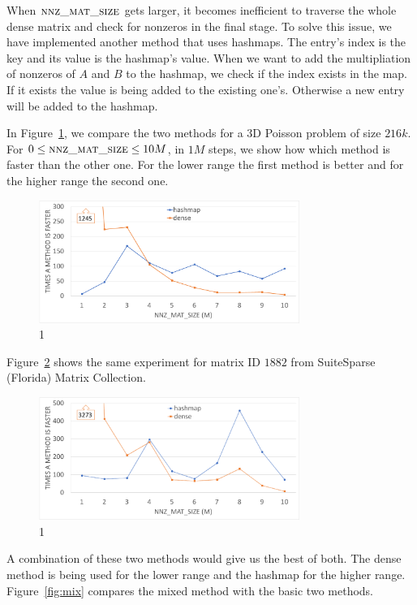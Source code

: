 When $\textsc{nnz\_mat\_size}$ gets larger, it becomes inefficient to traverse the whole dense matrix and check for nonzeros in the final stage. To solve this issue, we have implemented another method that uses hashmaps. The entry's index is the key and its value is the hashmap's value. When we want to add the multipliation of nonzeros of $A$ and $B$ to the hashmap, we check if the index exists in the map. If it exists the value is being added to the existing one's. Otherwise a new entry will be added to the hashmap.

In Figure~\ref{fig:lap60}, we compare the two methods for a 3D Poisson problem of size $216k$. For $0 \leq \textsc{nnz\_mat\_size} \leq 10M$, in $1M$ steps, we show how which method is faster than the other one. For the lower range the first method is better and for the higher range the second one.

\begin{figure}[tbh]
 \centering
 \includegraphics[width=8.5cm,height=4cm]{./figures/lap60_range.pdf}
 \caption{1}
 \label{fig:lap60}
\end{figure}

Figure~\ref{fig:eco} shows the same experiment for matrix ID $1882$ from SuiteSparse (Florida) Matrix Collection.

\begin{figure}[tbh]
 \centering
 \includegraphics[width=8.5cm,height=4cm]{./figures/eco_range.pdf}
 \caption{1}
 \label{fig:eco}
\end{figure}

A combination of these two methods would give us the best of both. The dense method is being used for the lower range and the hashmap for the higher range. Figure~\ref{fig:mix} compares the mixed method with the basic two methods.

